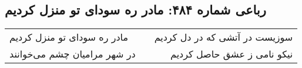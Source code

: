 \begin{center}
\section*{رباعی شماره ۴۸۴: مادر ره سودای تو منزل کردیم}
\label{sec:sh484}
\begin{longtable}{l p{0.5cm} r}
مادر ره سودای تو منزل کردیم
&&
سوزیست در آتشی که در دل کردیم
\\
در شهر مرامیان چشم می‌خوانند
&&
نیکو نامی ز عشق حاصل کردیم
\\
\end{longtable}
\end{center}
